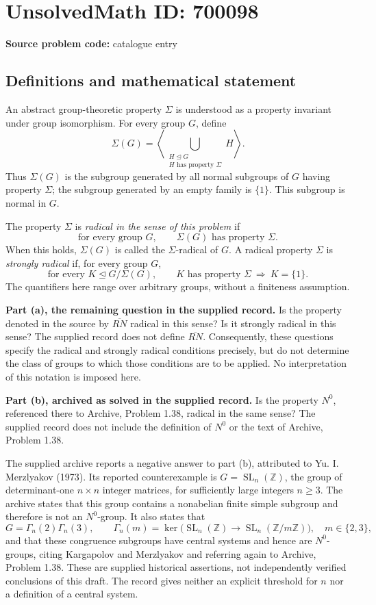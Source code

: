 \documentclass[11pt]{article}
\newcommand{\Z}{\mathbb{Z}}
\begin{document}
\section*{UnsolvedMath ID: 700098}
\textbf{Source problem code:} catalogue entry
\subsection{Definitions and mathematical statement}
An abstract group-theoretic property \(\Sigma\) is understood as a property invariant under group isomorphism. For every group \(G\), define
\[
\Sigma(G)=\left\langle\bigcup_{\substack{H\trianglelefteq G\\H\text{ has property }\Sigma}}H\right\rangle.
\]
Thus \(\Sigma(G)\) is the subgroup generated by all normal subgroups of \(G\) having property \(\Sigma\); the subgroup generated by an empty family is \(\{1\}\). This subgroup is normal in \(G\).

The property \(\Sigma\) is \emph{radical in the sense of this problem} if
\[
\text{for every group }G,\qquad \Sigma(G)\text{ has property }\Sigma.
\]
When this holds, \(\Sigma(G)\) is called the \(\Sigma\)-radical of \(G\). A radical property \(\Sigma\) is \emph{strongly radical} if, for every group \(G\),
\[
\text{for every }K\trianglelefteq G/\Sigma(G),\qquad
K\text{ has property }\Sigma\ \Longrightarrow\ K=\{1\}.
\]
The quantifiers here range over arbitrary groups, without a finiteness assumption.

\textbf{Part (a), the remaining question in the supplied record.} Is the property denoted in the source by \(\overline{\! RN}\) radical in this sense? Is it strongly radical in this sense? The supplied record does not define \(\overline{\! RN}\). Consequently, these questions specify the radical and strongly radical conditions precisely, but do not determine the class of groups to which those conditions are to be applied. No interpretation of this notation is imposed here.

\textbf{Part (b), archived as solved in the supplied record.} Is the property \(N^0\), referenced there to Archive, Problem 1.38, radical in the same sense? The supplied record does not include the definition of \(N^0\) or the text of Archive, Problem 1.38.

The supplied archive reports a negative answer to part (b), attributed to Yu. I. Merzlyakov (1973). Its reported counterexample is \(G=\operatorname{SL}_n(\Z)\), the group of determinant-one \(n\times n\) integer matrices, for sufficiently large integers \(n\geq 3\). The archive states that this group contains a nonabelian finite simple subgroup and therefore is not an \(N^0\)-group. It also states that
\[
G=\Gamma_n(2)\Gamma_n(3),\qquad
\Gamma_n(m)=\ker\bigl(\operatorname{SL}_n(\Z)\longrightarrow
\operatorname{SL}_n(\Z/m\Z)\bigr),\quad m\in\{2,3\},
\]
and that these congruence subgroups have central systems and hence are \(N^0\)-groups, citing Kargapolov and Merzlyakov and referring again to Archive, Problem 1.38. These are supplied historical assertions, not independently verified conclusions of this draft. The record gives neither an explicit threshold for \(n\) nor a definition of a central system.
\end{document}
